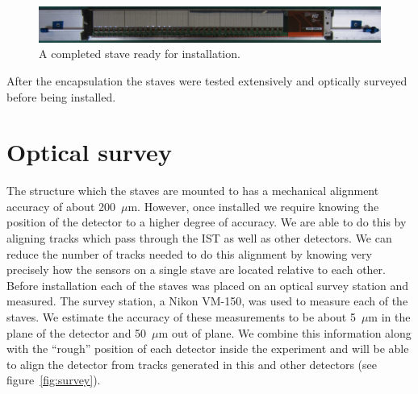 \documentclass[preprint,12pt]{elsarticle}
\begin{document}
\begin{figure}
\begin{center}
\includegraphics[width=6.5in, keepaspectratio=true, angle=0]{graphics/full_stave.jpg}
\caption{A completed stave ready for installation.
\label{fig:full_stave}}
\end{center}
\end{figure}
%
After the encapsulation the staves were tested extensively and optically surveyed
before being installed.

\section{Optical survey}
The structure which the staves are mounted to has a mechanical alignment
accuracy of about 200~$\mu$m. However, once installed we require knowing the
position of the detector to a higher degree of accuracy. We are able to do this
by aligning tracks which pass through the IST as well as other detectors. We
can reduce the number of tracks needed to do this alignment by knowing very
precisely how the sensors on a single stave are located relative to each other.
Before installation each of the staves was placed on an optical survey station
and measured. The survey station, a Nikon VM-150, was used to measure each of
the staves. We estimate the accuracy of these measurements to be about 5~$\mu$m in
the plane of the detector and 50~$\mu$m out of plane. We combine this information
along with the ``rough'' position of each detector inside the experiment and will
be able to align the detector from tracks generated in this and other detectors
(see figure~\ref{fig:survey}).
\end{document}
